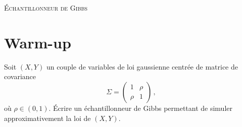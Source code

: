 \documentclass[a4paper,10pt,fleqn]{article}
\newcommand{\1}{\ensuremath{\mathbbm{1}}}
\begin{document}

\noindent\hrulefill

\begin{center}
\textsc{\'Echantillonneur de Gibbs}
\end{center}
\hrulefill

\medskip


\section*{Warm-up}
Soit $(X,Y)$ un couple de variables de loi gaussienne centr\'ee de matrice de covariance 
$$
\Sigma = \begin{pmatrix}
1 & \rho\\ \rho & 1
\end{pmatrix}\,,
$$
o\`u $\rho \in(0,1)$. 
\'Ecrire un \'echantillonneur de Gibbs permettant de simuler approximativement la loi de $(X,Y)$.

%
\end{document}
